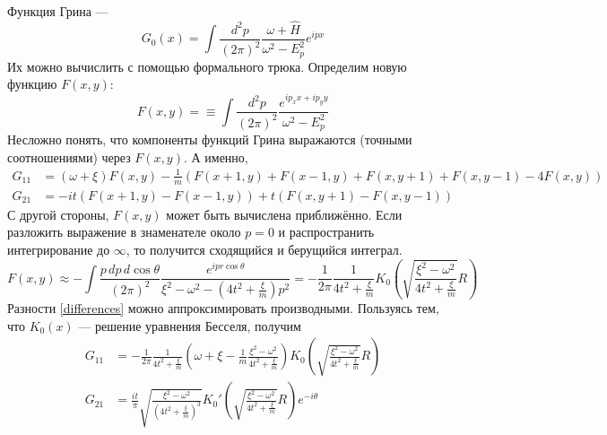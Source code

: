 \documentclass{article}
\begin{document}
Функция Грина --- 
\begin{equation}
    G_0(x) = \int \frac{d^2 p}{(2\pi)^2} 
            \frac{\omega + \hat{H}}{\omega^2 - E_p^2} e^{ipx}
\end{equation}
Их можно вычислить с помощью формального трюка. Определим новую функцию
$F(x,y)$:
\begin{equation}
    F(x,y) = \equiv \int \frac{d^2 p}{(2\pi)^2} 
            \frac{e^{ip_x x + ip_y y}}{\omega^2 - E_p^2} 
\end{equation}
Несложно понять, что компоненты функций Грина выражаются (точными соотношениями)
 через $F(x,y)$. А именно,
\begin{equation}
    \label{differences}
    \begin{split}
        G_{11} & = (\omega + \xi) F(x,y) - 
            \frac{1}{m}(F(x+1,y) + F(x-1,y) + F(x,y+1) + F(x, y-1) - 4F(x,y))\\
        G_{21} & = -it(F(x+1,y) - F(x-1,y)) + t(F(x,y+1) - F(x,y-1))
    \end{split}
\end{equation}
С другой стороны, $F(x,y)$ может быть вычислена приближённо. Если разложить 
выражение в знаменателе около $p = 0$ и распространить интегрирование до $\infty$, то получится
сходящийся и берущийся интеграл.
\begin{equation}
    F(x,y) \approx -\int \frac{p\,dp\,d\cos{\theta}}{(2\pi)^2} 
        \frac{e^{ipr\cos{\theta}}}{\xi^2 - \omega^2 - (4t^2 + \frac{\xi}{m})p^2} = 
        -\frac{1}{2\pi} \frac{1}{4t^2 + \frac{\xi}{m}}
        K_0 \left(\sqrt{\frac{\xi^2 - \omega^2}{4t^2 + \frac{\xi}{m}}}R \right)
\end{equation}
Разности \eqref{differences} можно аппроксимировать производными. Пользуясь тем, что
$K_0(x)$ --- решение уравнения Бесселя, получим 
\begin{equation}
    \begin{split}
        G_{11} & = -\frac{1}{2\pi} \frac{1}{4t^2 + \frac{\xi}{m}}
        \left( \omega + \xi - \frac{1}{m} \frac{\xi^2 - \omega^2}{4t^2 + \frac{\xi}{m}} \right)
        K_0 \left(\sqrt{\frac{\xi^2 - \omega^2}{4t^2 + \frac{\xi}{m}}}R \right)\\
        G_{21} & = \frac{it}{\pi} \sqrt{\frac{\xi^2 - \omega^2}
                                     {(4t^2 + \frac{\xi}{m})^{3}}}
        K_0' \left(\sqrt{\frac{\xi^2 - \omega^2}{4t^2 + \frac{\xi}{m}}}R \right)e^{-i\theta}
    \end{split}
\end{equation}
\end{document}
